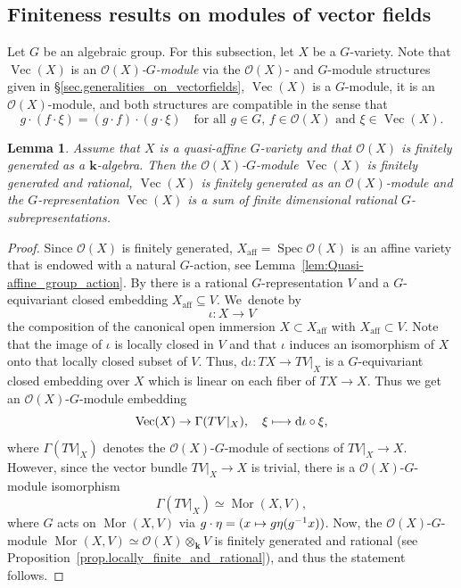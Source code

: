 \documentclass[JEP,XML,SOM,Unicode]{cedram}
\let\mathcal\mathscr
\def\mto{\mathchoice{\longmapsto}{\mapsto}{\mapsto}{\mapsto}}
\theoremstyle{plain}
\newtheorem{lemma}[theorem]{Lemma}
\theoremstyle{definition}
\DeclareMathOperator{\Spec}{Spec}
\DeclareMathOperator{\aff}{aff}
\DeclareMathOperator{\Ve}{Vec}
\DeclareMathOperator{\Mor}{Mor}
\newcommand{\OO}{\mathcal{O}}
\newcommand{\kk}{{\boldsymbol{k}}}
\begin{document}
\subsection{Finiteness results on modules of vector fields}

Let $G$ be an algebraic group. For this subsection, let $X$ be a $G$-variety.
Note that $\Ve(X)$ is an
\emph{$\OO(X)$-$G$-module} via the $\OO(X)$- and $G$-module structures given in \S\ref{sec.generalities_on_vectorfields},
\ie $\Ve(X)$ is a $G$-module, it is an $\OO(X)$-module,
and both structures are compatible in the sense that
\[
g \cdot (f \cdot \xi) = (g \cdot f) \cdot (g \cdot \xi) \quad
\textrm{for all $g \in G$, $f \in \OO(X)$ and $\xi \in \Ve(X)$.}
\]

\begin{lemma}
\label{lem.finiteness_and_rationality_of_VecX}
Assume that $X$ is a quasi-affine $G$-variety and that $\OO(X)$ is finitely generated as a $\kk$-algebra.
Then the $\OO(X)$-$G$-module $\Ve(X)$ is finitely generated and rational,
\ie $\Ve(X)$ is finitely generated as an $\OO(X)$-module
and the $G$\nobreakdash-repre\-sentation $\Ve(X)$ is a sum of finite dimensional
rational $G$-subrepresentations.
\end{lemma}

\begin{proof}
Since $\OO(X)$ is finitely generated, $X_{\aff} = \Spec \OO(X)$ is an affine variety
that is endowed with a natural $G$-action, see Lemma~\ref{lem:Quasi-affine_group_action}. By
\cite[Satz\,2, II.2.S]{Kr1984Geometrische-Metho} there is a rational $G$-representation $V$ and a $G$-equivariant
closed embedding $X_{\aff} \subseteq V$. We~denote by
\[
\iota \colon X \to V
\]
the composition of the canonical open immersion $X \subset X_{\aff}$ with $X_{\aff} \subset V$.
Note that the image of $\iota$ is locally closed in $V$ and that $\iota$ induces
an isomorphism of $X$ onto that locally closed subset of $V$.
Thus, $\mathrm{d} \iota \colon T X \to T V |_X$ is a $G$-equivariant closed
embedding over $X$ which is linear on each fiber of $T X \to X$.
Thus we get an $\OO(X)$-$G$-module embedding
\[
\Ve(X) \to \Gamma(TV |_X), \quad
\xi \mto \mathrm{d} \iota \circ \xi,
\]
where $\Gamma(TV |_X)$ denotes the $\OO(X)$-$G$-module
of sections of $TV |_X \to X$. However, since the vector bundle
$TV |_X \to X$ is trivial, there is a
$\OO(X)$-$G$-module isomorphism
\[
\Gamma(TV |_X) \simeq \Mor(X, V),
\]
where $G$ acts on $\Mor(X, V)$ via $g \cdot \eta = (x \mto g\eta(g^{-1}x))$.
Now, the $\OO(X)$-$G$-module
$\Mor(X, V) \simeq \OO(X) \otimes_{\kk} V$ is finitely generated and
rational (see Proposition~\ref{prop.locally_finite_and_rational}),
and thus the statement follows.
\end{proof}
\end{document}
